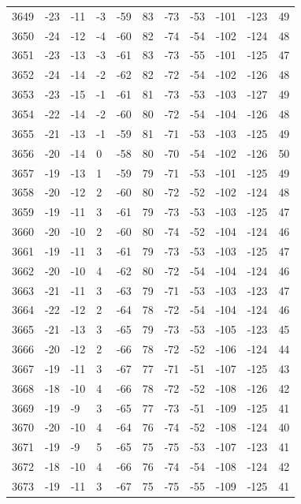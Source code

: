 \begin{table}[H]
\begin{tabular}{lllllllllll}
3649 & -23 & -11 & -3 & -59 & 83 & -73 & -53 & -101 & -123 & 49 \\
3650 & -24 & -12 & -4 & -60 & 82 & -74 & -54 & -102 & -124 & 48 \\
3651 & -23 & -13 & -3 & -61 & 83 & -73 & -55 & -101 & -125 & 47 \\
3652 & -24 & -14 & -2 & -62 & 82 & -72 & -54 & -102 & -126 & 48 \\
3653 & -23 & -15 & -1 & -61 & 81 & -73 & -53 & -103 & -127 & 49 \\
3654 & -22 & -14 & -2 & -60 & 80 & -72 & -54 & -104 & -126 & 48 \\
3655 & -21 & -13 & -1 & -59 & 81 & -71 & -53 & -103 & -125 & 49 \\
3656 & -20 & -14 & 0 & -58 & 80 & -70 & -54 & -102 & -126 & 50 \\
3657 & -19 & -13 & 1 & -59 & 79 & -71 & -53 & -101 & -125 & 49 \\
3658 & -20 & -12 & 2 & -60 & 80 & -72 & -52 & -102 & -124 & 48 \\
3659 & -19 & -11 & 3 & -61 & 79 & -73 & -53 & -103 & -125 & 47 \\
3660 & -20 & -10 & 2 & -60 & 80 & -74 & -52 & -104 & -124 & 46 \\
3661 & -19 & -11 & 3 & -61 & 79 & -73 & -53 & -103 & -125 & 47 \\
3662 & -20 & -10 & 4 & -62 & 80 & -72 & -54 & -104 & -124 & 46 \\
3663 & -21 & -11 & 3 & -63 & 79 & -71 & -53 & -103 & -123 & 47 \\
3664 & -22 & -12 & 2 & -64 & 78 & -72 & -54 & -104 & -124 & 46 \\
3665 & -21 & -13 & 3 & -65 & 79 & -73 & -53 & -105 & -123 & 45 \\
3666 & -20 & -12 & 2 & -66 & 78 & -72 & -52 & -106 & -124 & 44 \\
3667 & -19 & -11 & 3 & -67 & 77 & -71 & -51 & -107 & -125 & 43 \\
3668 & -18 & -10 & 4 & -66 & 78 & -72 & -52 & -108 & -126 & 42 \\
3669 & -19 & -9 & 3 & -65 & 77 & -73 & -51 & -109 & -125 & 41 \\
3670 & -20 & -10 & 4 & -64 & 76 & -74 & -52 & -108 & -124 & 40 \\
3671 & -19 & -9 & 5 & -65 & 75 & -75 & -53 & -107 & -123 & 41 \\
3672 & -18 & -10 & 4 & -66 & 76 & -74 & -54 & -108 & -124 & 42 \\
3673 & -19 & -11 & 3 & -67 & 75 & -75 & -55 & -109 & -125 & 41 \\

\end{tabular}
\end{table}
